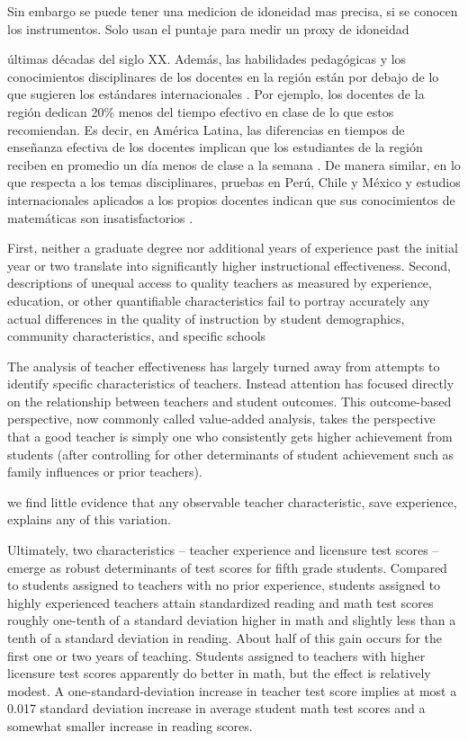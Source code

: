 Sin embargo se puede tener una medicion de idoneidad mas precisa, si se conocen los instrumentos. Solo usan el puntaje para medir un proxy de idoneidad


últimas décadas del siglo XX. Además, las habilidades pedagógicas y los conocimientos disciplinares de los docentes en la región están por debajo de lo que sugieren los estándares internacionales \citep{Hincapie_et_al_2020}. Por ejemplo, los docentes de la región dedican 20\% menos del tiempo efectivo en clase de lo que estos recomiendan. Es decir, en América Latina, las diferencias en tiempos de enseñanza efectiva de los docentes implican que los estudiantes de la región reciben en promedio un día menos de clase a la semana \citep{Bruns_et_al_2015}. De manera similar, en lo que respecta a los temas disciplinares, pruebas en Perú, Chile y México y estudios internacionales aplicados a los propios docentes indican que sus conocimientos de matemáticas son insatisfactorios \citep{Elacqua_et_al_2018}.


First, neither a graduate degree nor additional years of experience past the initial year or two translate into significantly higher instructional effectiveness. Second, descriptions of unequal access to quality teachers as measured by experience, education, or other quantifiable characteristics fail to portray accurately any actual differences in the quality of instruction by student demographics, community characteristics, and specific schools \citep{Hanushek_et_al_2012}


The analysis of teacher effectiveness has largely turned away from attempts to identify specific characteristics of teachers. Instead attention has focused directly on the relationship between teachers and student outcomes. This outcome-based perspective, now commonly called value-added analysis, takes the perspective that a good teacher is simply one who consistently gets higher achievement from students (after controlling for other determinants of student achievement such as family influences or prior teachers). \citep{Hanushek_et_al_2012}


we find little evidence that any observable teacher characteristic, save experience, explains any of this variation. \citep{Clotfelter_et_al_2006}


Ultimately, two characteristics – teacher experience and licensure test scores – emerge as robust determinants of test scores for fifth grade students. Compared to students assigned to teachers with no prior experience, students assigned to highly experienced teachers attain standardized reading and math test scores roughly one-tenth of a standard deviation higher in math and slightly less than a tenth of a standard deviation in reading. About half of this gain occurs for the first one or two years of teaching. Students assigned to teachers with higher licensure test scores apparently do better in math, but the effect is relatively modest. A one-standard-deviation increase in teacher test score implies at most a 0.017 standard deviation increase in average student math test scores and a somewhat smaller increase in reading scores. \citep{Clotfelter_et_al_2006}


